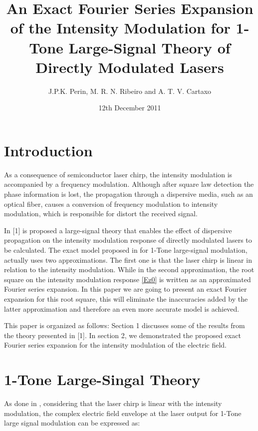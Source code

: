 \documentclass[twocolumn]{el-author}
\date{12th December 2011}
\begin{document}
\title{An Exact Fourier Series Expansion of the Intensity Modulation for 1-Tone Large-Signal Theory of Directly Modulated Lasers}

\author{J.P.K. Perin, M. R. N. Ribeiro and A. T. V. Cartaxo}


\maketitle

\section{Introduction}
As a consequence of semiconductor laser chirp, the intensity modulation is accompanied by a frequency modulation. Although after square law detection the phase information is lost, the propagation through a dispersive media, such as an optical fiber, causes a conversion of frequency modulation to intensity modulation, which is responsible for distort the received signal.

In [1] is proposed a large-signal theory that enables the effect of dispersive propagation on the intensity modulation response of directly modulated lasers to be calculated. The exact model proposed in \cite{eva} for 1-Tone large-signal modulation, actually uses two approximations. The first one is that the laser chirp is linear in relation to the intensity modulation. While in the second approximation, the root square on the intensity modulation response \eqref{Ez0} is written as an approximated Fourier series expansion. In this paper we are going to present an exact Fourier expansion for this root square, this will eliminate the inaccuracies added by the latter approximation and therefore an even more accurate model is achieved.

This paper is organized as follows: Section 1 discusses some of the results from the theory presented in [1]. In section 2, we demonstrated the proposed exact Fourier series expansion for the intensity modulation of the electric field. 

\section{1-Tone Large-Singal Theory}
As done in \cite{eva}, considering that the laser chirp is linear with the intensity modulation, the complex electric field envelope at the laser output for 1-Tone large signal modulation can be expressed as:
\end{document}
